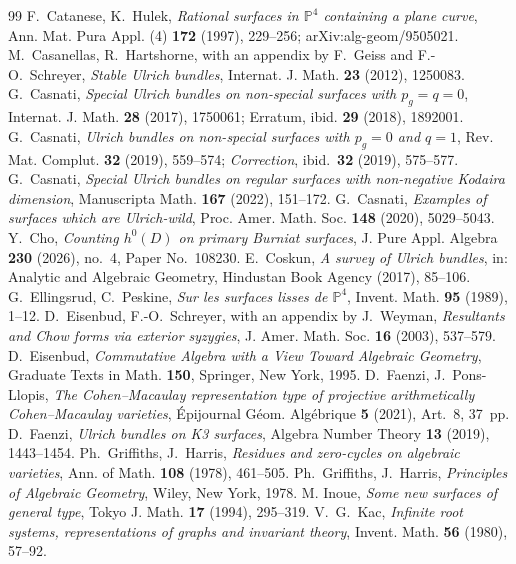 \documentclass[10pt,a4paper]{amsart}
\newcommand{\PP}{\mathbb{P}}
\begin{document}
\begin{thebibliography}{99}
 F.~Catanese, K.~Hulek, \emph{Rational surfaces in $\PP^4$ containing a plane curve}, Ann. Mat. Pura Appl. (4) \textbf{172} (1997), 229--256; arXiv:alg-geom/9505021.
 M.~Casanellas, R.~Hartshorne, with an appendix by F.~Geiss and F.-O.~Schreyer, \emph{Stable Ulrich bundles}, Internat. J. Math. \textbf{23} (2012), 1250083.
 G.~Casnati, \emph{Special Ulrich bundles on non-special surfaces with $p_g=q=0$}, Internat. J. Math. \textbf{28} (2017), 1750061; Erratum, ibid. \textbf{29} (2018), 1892001.
 G.~Casnati, \emph{Ulrich bundles on non-special surfaces with $p_g=0$ and $q=1$}, Rev. Mat. Complut. \textbf{32} (2019), 559--574; \emph{Correction}, ibid.\ \textbf{32} (2019), 575--577.
 G.~Casnati, \emph{Special Ulrich bundles on regular surfaces with non-negative Kodaira dimension}, Manuscripta Math. \textbf{167} (2022), 151--172.
 G.~Casnati, \emph{Examples of surfaces which are Ulrich-wild}, Proc. Amer. Math. Soc. \textbf{148} (2020), 5029--5043.
 Y.~Cho, \emph{Counting $h^0(D)$ on primary Burniat surfaces}, J. Pure Appl. Algebra \textbf{230} (2026), no.~4, Paper No.\ 108230.
 E.~Coskun, \emph{A survey of Ulrich bundles}, in: Analytic and Algebraic Geometry, Hindustan Book Agency (2017), 85--106.
 G.~Ellingsrud, C.~Peskine, \emph{Sur les surfaces lisses de $\PP^4$}, Invent. Math. \textbf{95} (1989), 1--12.
 D.~Eisenbud, F.-O.~Schreyer, with an appendix by J.~Weyman, \emph{Resultants and Chow forms via exterior syzygies}, J. Amer. Math. Soc. \textbf{16} (2003), 537--579.
 D.~Eisenbud, \emph{Commutative Algebra with a View Toward Algebraic Geometry}, Graduate Texts in Math. \textbf{150}, Springer, New York, 1995.
 D.~Faenzi, J.~Pons-Llopis, \emph{The Cohen--Macaulay representation type of projective arithmetically Cohen--Macaulay varieties}, \'Epijournal G\'eom. Alg\'ebrique \textbf{5} (2021), Art.~8, 37~pp.
 D.~Faenzi, \emph{Ulrich bundles on K3 surfaces}, Algebra Number Theory \textbf{13} (2019), 1443--1454.
 Ph.~Griffiths, J.~Harris, \emph{Residues and zero-cycles on algebraic varieties}, Ann. of Math. \textbf{108} (1978), 461--505.
 Ph.~Griffiths, J.~Harris, \emph{Principles of Algebraic Geometry}, Wiley, New York, 1978.
 M. Inoue, \emph{Some new surfaces of general type}, Tokyo J. Math. \textbf{17} (1994), 295--319.
 V.~G.~Kac, \emph{Infinite root systems, representations of graphs and invariant theory}, Invent. Math. \textbf{56} (1980), 57--92.

\end{thebibliography}
\end{document}
